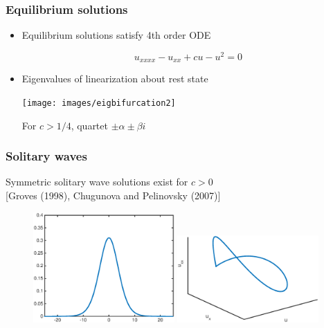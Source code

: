\documentclass[16pt]{beamer}
\begin{document}
\begin{frame}
	\frametitle{Equilibrium solutions}
	\fontsize{16}{7.2}\selectfont
	\begin{itemize}
		\item Equilibrium solutions satisfy 4th order ODE
		\begin{center}
		\[u_{xxxx} - u_{xx} + cu - u^2 = 0\]
		\end{center}
		\vspace{0.25cm}
		\item Eigenvalues of linearization about rest state
		\begin{center}
		\texttt{[image: images/eigbifurcation2]}
		\end{center}
		For $c > 1/4$, quartet $\pm \alpha \pm \beta i$
	\end{itemize}
\end{frame}

\begin{frame}
	\frametitle{Solitary waves}
	\fontsize{16}{7.2}\selectfont

	Symmetric solitary wave solutions exist for $c > 0$ \\ \footnotesize [Groves (1998), Chugunova and Pelinovsky (2007)]

	\begin{figure}
   		\includegraphics[width=0.48\textwidth]{images/exactsol}
   		\includegraphics[width=0.48\textwidth]{images/exactsolorbit}
	\end{figure}
\end{frame}
\end{document}
